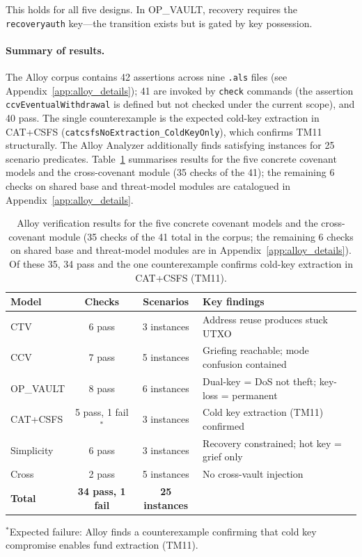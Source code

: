 \noindent
This holds for all five designs. In OP\_VAULT, recovery requires the
\texttt{recoveryauth} key---the transition exists but is gated by key possession.

\paragraph{Summary of results.}
The Alloy corpus contains 42 assertions across nine \texttt{.als}
files (see Appendix~\ref{app:alloy_details}); 41 are invoked by
\texttt{check} commands (the assertion \texttt{ccvEventualWithdrawal}
is defined but not checked under the current scope), and 40 pass.
The single counterexample is the expected cold-key extraction in
CAT+CSFS (\texttt{catcsfsNoExtraction\_ColdKeyOnly}), which confirms
TM11 structurally. The Alloy Analyzer additionally finds satisfying
instances for 25 scenario predicates. Table~\ref{tab:alloy_results}
summarises results for the five concrete covenant models and the
cross-covenant module (35 checks of the 41); the remaining 6 checks
on shared base and threat-model modules are catalogued in
Appendix~\ref{app:alloy_details}.

\begin{table}[t]
\centering
\caption{Alloy verification results for the five concrete covenant
models and the cross-covenant module (35 checks of the 41 total in
the corpus; the remaining 6 checks on shared base and threat-model
modules are in Appendix~\ref{app:alloy_details}). Of these 35, 34 pass and
the one counterexample confirms cold-key extraction in CAT+CSFS
(TM11).}
\label{tab:alloy_results}
\small
\begin{tabular}{@{}lccp{4.5cm}@{}}
\toprule
Model & Checks & Scenarios & Key findings \\
\midrule
CTV        & 6 pass & 3 instances &
  Address reuse produces stuck UTXO \\
CCV        & 7 pass & 5 instances &
  Griefing reachable; mode confusion contained \\
OP\_VAULT  & 8 pass & 6 instances &
  Dual-key = DoS not theft; key-loss = permanent \\
CAT+CSFS   & 5 pass, 1 fail$^*$ & 3 instances &
  Cold key extraction (TM11) confirmed \\
Simplicity & 6 pass & 3 instances &
  Recovery constrained; hot key = grief only \\
Cross       & 2 pass & 5 instances &
  No cross-vault injection \\
\midrule
\textbf{Total} & \textbf{34 pass, 1 fail} & \textbf{25 instances} & \\
\bottomrule
\end{tabular}

\vspace{4pt}
{\footnotesize $^*$Expected failure: Alloy finds a counterexample confirming that
cold key compromise enables fund extraction (TM11).}
\end{table}

